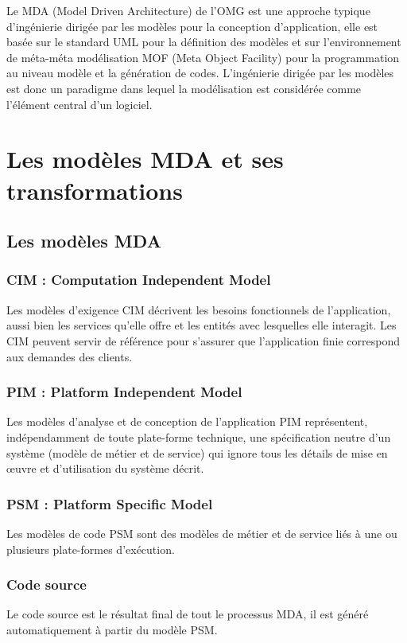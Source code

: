 \documentclass[
10pt, %
a4paper, %
oneside, %
headinclude,footinclude, %
BCOR5mm, %
]{report}
\begin{document}
    Le MDA (Model Driven Architecture) de l’OMG est une approche typique d’ingénierie dirigée par les modèles pour la conception d’application, elle est basée sur le standard UML pour la définition des modèles et sur l’environnement de méta-méta modélisation MOF (Meta Object Facility) pour la programmation au niveau modèle et la génération de codes.
		L'ingénierie dirigée par les modèles est donc un paradigme dans lequel la modélisation est considérée comme l'élément central d'un logiciel.   
					
		\section{Les modèles MDA et ses transformations}
					
		\subsection{Les modèles MDA}
		\subsubsection{ CIM : Computation Independent Model }
		Les  modèles d'exigence CIM décrivent les besoins fonctionnels de l'application, aussi bien les services qu'elle offre et les entités avec lesquelles elle interagit. Les CIM peuvent servir de référence pour s'assurer que l'application finie correspond aux demandes des clients.
		\subsubsection{ PIM : Platform Independent Model}
		Les modèles d’analyse et de conception de l’application PIM représentent, indépendamment de toute plate-forme technique, une  spécification neutre d'un système (modèle de métier et de service) qui ignore tous les détails de mise en œuvre et d’utilisation du système décrit.
		\subsubsection{PSM  : Platform Specific Model}
		Les modèles de code PSM sont des modèles de métier et de service liés  à une ou plusieurs plate-formes d’exécution.
		\subsubsection{Code source}
		Le code source est le résultat final de tout le processus MDA, il est généré automatiquement à partir du modèle PSM.
\end{document}
